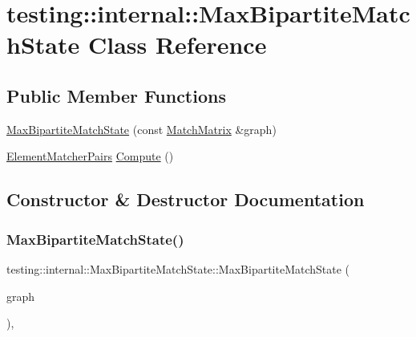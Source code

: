 \hypertarget{classtesting_1_1internal_1_1_max_bipartite_match_state}{}\section{testing\+:\+:internal\+:\+:Max\+Bipartite\+Match\+State Class Reference}
\label{classtesting_1_1internal_1_1_max_bipartite_match_state}
\subsection*{Public Member Functions}
\begin{DoxyCompactItemize}
\item 
\hyperlink{classtesting_1_1internal_1_1_max_bipartite_match_state_a9d0166d5cc7afd1b741f6c312df72b54}{Max\+Bipartite\+Match\+State} (const \hyperlink{classtesting_1_1internal_1_1_match_matrix}{Match\+Matrix} \&graph)
\item 
\hyperlink{namespacetesting_1_1internal_a0038618710c01a71150887dc7cfb0a29}{Element\+Matcher\+Pairs} \hyperlink{classtesting_1_1internal_1_1_max_bipartite_match_state_af6efab664ee390925b24d023f1368192}{Compute} ()
\end{DoxyCompactItemize}


\subsection{Constructor \& Destructor Documentation}
\mbox{\label{classtesting_1_1internal_1_1_max_bipartite_match_state_a9d0166d5cc7afd1b741f6c312df72b54}} 
\subsubsection{\texorpdfstring{Max\+Bipartite\+Match\+State()}{MaxBipartiteMatchState()}}
{\footnotesize\ttfamily testing\+::internal\+::\+Max\+Bipartite\+Match\+State\+::\+Max\+Bipartite\+Match\+State (\begin{DoxyParamCaption}\item[{const \hyperlink{classtesting_1_1internal_1_1_match_matrix}{Match\+Matrix} \&}]{graph }\end{DoxyParamCaption})\hspace{0.3cm}{\ttfamily [inline]}, {\ttfamily [explicit]}}



